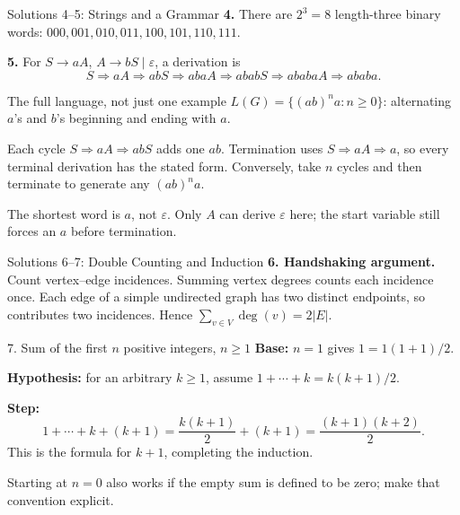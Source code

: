 \documentclass[10pt]{beamer}
\begin{document}
\begin{frame}{Solutions 4--5: Strings and a Grammar}
  \small
  \textbf{4.} There are $2^3=8$ length-three binary words:
  $000,001,010,011,100,101,110,111$.
  \pause
  \par\medskip
  \textbf{5.} For $S\to aA$, $A\to bS\mid\varepsilon$, a derivation is
  \[
    S\Rightarrow aA\Rightarrow abS\Rightarrow abaA
      \Rightarrow ababS\Rightarrow ababaA\Rightarrow ababa.
  \]
  \begin{block}{The full language, not just one example}
    $L(G)=\{(ab)^n a:n\ge0\}$: alternating $a$'s and $b$'s beginning
    and ending with $a$.
    \par\smallskip
    Each cycle $S\Rightarrow aA\Rightarrow abS$ adds one $ab$.
    Termination uses $S\Rightarrow aA\Rightarrow a$, so every terminal
    derivation has the stated form. Conversely, take $n$ cycles and then
    terminate to generate any $(ab)^na$.
  \end{block}
  \pause
  The shortest word is $a$, not $\varepsilon$. Only $A$ can derive $\varepsilon$ here;
  the start variable still forces an $a$ before termination.
\end{frame}

\begin{frame}{Solutions 6--7: Double Counting and Induction}
  \small
  \textbf{6. Handshaking argument.} Count vertex--edge incidences.
  Summing vertex degrees counts each incidence once. Each edge of a simple
  undirected graph has two distinct endpoints, so contributes two incidences.
  Hence $\sum_{v\in V}\deg(v)=2|E|$.
  \pause
  \begin{block}{7. Sum of the first $n$ positive integers, $n\ge1$}
    \textbf{Base:} $n=1$ gives $1=1(1+1)/2$.
    \par\smallskip
    \textbf{Hypothesis:} for an arbitrary $k\ge1$, assume
    $1+\cdots+k=k(k+1)/2$.
    \par\smallskip
    \textbf{Step:}
    \[
      1+\cdots+k+(k+1)
      =\frac{k(k+1)}2+(k+1)
      =\frac{(k+1)(k+2)}2.
    \]
    This is the formula for $k+1$, completing the induction.
  \end{block}
  Starting at $n=0$ also works if the empty sum is defined to be zero;
  make that convention explicit.
\end{frame}
\end{document}
